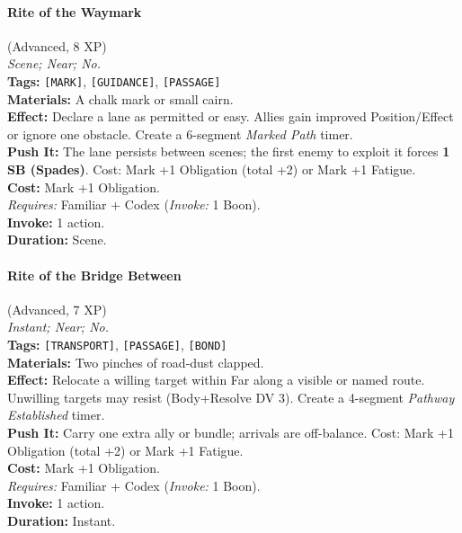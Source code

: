 \paragraph{Rite of the Waymark} (Advanced, 8 XP) \hfill \\
\emph{Scene; Near; No.} \\
\textbf{Tags:} \texttt{[MARK]}, \texttt{[GUIDANCE]}, \texttt{[PASSAGE]} \\
\textbf{Materials:} A chalk mark or small cairn. \\
\textbf{Effect:} Declare a lane as permitted or easy. Allies gain improved Position/Effect or ignore one obstacle. Create a 6-segment \textit{Marked Path} timer. \\
\textbf{Push It:} The lane persists between scenes; the first enemy to exploit it forces \textbf{1 SB (Spades)}. Cost: Mark +1 Obligation (total +2) or Mark +1 Fatigue. \\
\textbf{Cost:} Mark +1 Obligation. \\
\textit{Requires:} Familiar + Codex (\textit{Invoke:} 1 Boon). \\
\textbf{Invoke:} 1 action. \\
\textbf{Duration:} Scene.

\paragraph{Rite of the Bridge Between} (Advanced, 7 XP) \hfill \\
\emph{Instant; Near; No.} \\
\textbf{Tags:} \texttt{[TRANSPORT]}, \texttt{[PASSAGE]}, \texttt{[BOND]} \\
\textbf{Materials:} Two pinches of road-dust clapped. \\
\textbf{Effect:} Relocate a willing target within Far along a visible or named route. Unwilling targets may resist (Body+Resolve DV 3). Create a 4-segment \textit{Pathway Established} timer. \\
\textbf{Push It:} Carry one extra ally or bundle; arrivals are off-balance. Cost: Mark +1 Obligation (total +2) or Mark +1 Fatigue. \\
\textbf{Cost:} Mark +1 Obligation. \\
\textit{Requires:} Familiar + Codex (\textit{Invoke:} 1 Boon). \\
\textbf{Invoke:} 1 action. \\
\textbf{Duration:} Instant.


